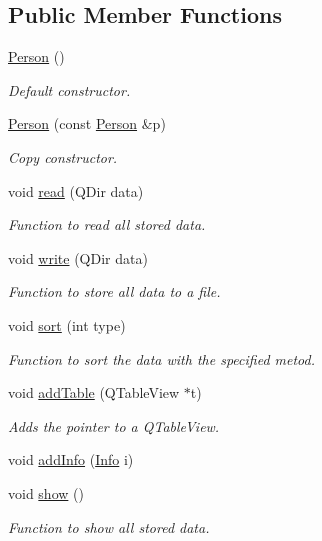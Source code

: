 \subsection*{Public Member Functions}
\begin{DoxyCompactItemize}
\item 
\hyperlink{class_person_a0397c6f89fafc12e738923f612bc41a3}{Person} ()
\begin{DoxyCompactList}\small\item\em Default constructor. \end{DoxyCompactList}\item 
\hyperlink{class_person_a847845e2e214a89e790c584678f1ea97}{Person} (const \hyperlink{class_person}{Person} \&p)
\begin{DoxyCompactList}\small\item\em Copy constructor. \end{DoxyCompactList}\item 
void \hyperlink{class_person_a98c73f33a51b80cc9296a949f2fc5cf3}{read} (Q\+Dir data)
\begin{DoxyCompactList}\small\item\em Function to read all stored data. \end{DoxyCompactList}\item 
void \hyperlink{class_person_aa667ce32c0552e818ac6df14c9a5f50d}{write} (Q\+Dir data)
\begin{DoxyCompactList}\small\item\em Function to store all data to a file. \end{DoxyCompactList}\item 
void \hyperlink{class_person_a602ce88a8ef959c3f4044d9dc00dd2cf}{sort} (int type)
\begin{DoxyCompactList}\small\item\em Function to sort the data with the specified metod. \end{DoxyCompactList}\item 
void \hyperlink{class_person_a100215914f651662a6207722ef28769e}{add\+Table} (Q\+Table\+View $\ast$t)
\begin{DoxyCompactList}\small\item\em Adds the pointer to a Q\+Table\+View. \end{DoxyCompactList}\item 
void \hyperlink{class_person_a868dda73091bcad264cad3fd59286400}{add\+Info} (\hyperlink{struct_info}{Info} i)
\item 
void \hyperlink{class_person_a2f1231629a6e7e8c83ada57628e80a89}{show} ()
\begin{DoxyCompactList}\small\item\em Function to show all stored data. \end{DoxyCompactList}\end{DoxyCompactItemize}

